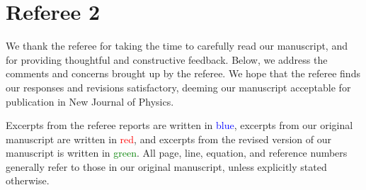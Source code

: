 \documentclass[preprint,showkeys,nofootinbib]{revtex4-1}
\newcommand{\1}{\mathds{1}}
\newcommand{\blue}[1]{\textcolor{blue}{#1}}
\newcommand{\red}[1]{\textcolor{red}{#1}}
\newcommand{\green}[1]{\textcolor{green}{#1}}
\begin{document}
\section*{Referee 2}

We thank the referee for taking the time to carefully read our
manuscript, and for providing thoughtful and constructive feedback.
Below, we address the comments and concerns brought up by the referee.
We hope that the referee finds our responses and revisions
satisfactory, deeming our manuscript acceptable for publication in New
Journal of Physics.

Excerpts from the referee reports are written in \blue{blue}, excerpts
from our original manuscript are written in \red{red}, and excerpts
from the revised version of our manuscript is written in
\green{green}.  All page, line, equation, and reference numbers
generally refer to those in our original manuscript, unless explicitly
stated otherwise.
\end{document}
